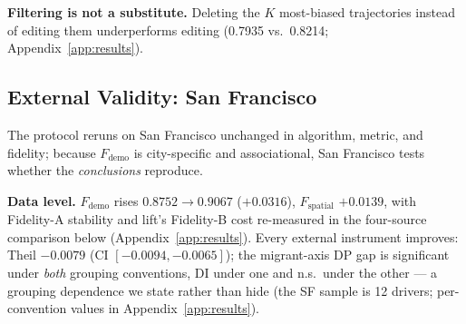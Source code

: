 \textbf{Filtering is not a substitute.} Deleting the $K$ most-biased
trajectories instead of editing them underperforms editing (0.7935 vs.\
0.8214; Appendix~\ref{app:results}).

\subsection{External Validity: San Francisco}\label{sec:exp-sf}

The protocol reruns on San Francisco unchanged in algorithm, metric, and
fidelity; because $F_{\mathrm{demo}}$ is city-specific and associational, 
San Francisco tests whether the \emph{conclusions} reproduce.

\textbf{Data level.} $F_{\mathrm{demo}}$ rises $0.8752{\to}0.9067$
($+0.0316$), $F_{\mathrm{spatial}}$ $+0.0139$, with Fidelity-A stability and %
lift's Fidelity-B cost re-measured in the four-source comparison below
(Appendix~\ref{app:results}). Every external instrument improves: Theil $-0.0079$
(CI $[-0.0094, -0.0065]$); the migrant-axis DP gap is significant under
\emph{both} grouping conventions, DI under one and n.s.\ under the other
--- a grouping dependence we state rather than hide (the SF sample is 12
drivers; per-convention values in Appendix~\ref{app:results}).

